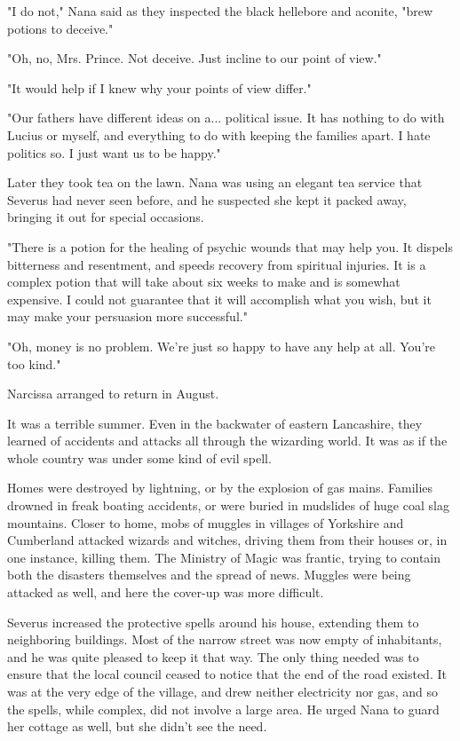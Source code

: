 "I do not," Nana said as they inspected the black hellebore and aconite, "brew potions to deceive."

"Oh, no, Mrs. Prince. Not deceive. Just incline to our point of view."

"It would help if I knew why your points of view differ."

"Our fathers have different ideas on a... political issue. It has nothing to do with Lucius or myself, and everything to do with keeping the families apart. I hate politics so. I just want us to be happy."

Later they took tea on the lawn. Nana was using an elegant tea service that Severus had never seen before, and he suspected she kept it packed away, bringing it out for special occasions.

"There is a potion for the healing of psychic wounds that may help you. It dispels bitterness and resentment, and speeds recovery from spiritual injuries. It is a complex potion that will take about six weeks to make and is somewhat expensive. I could not guarantee that it will accomplish what you wish, but it may make your persuasion more successful."

"Oh, money is no problem. We're just so happy to have any help at all. You're too kind."

Narcissa arranged to return in August.

It was a terrible summer. Even in the backwater of eastern Lancashire, they learned of accidents and attacks all through the wizarding world. It was as if the whole country was under some kind of evil spell.

Homes were destroyed by lightning, or by the explosion of gas mains. Families drowned in freak boating accidents, or were buried in mudslides of huge coal slag mountains. Closer to home, mobs of muggles in villages of Yorkshire and Cumberland attacked wizards and witches, driving them from their houses or, in one instance, killing them. The Ministry of Magic was frantic, trying to contain both the disasters themselves and the spread of news. Muggles were being attacked as well, and here the cover-up was more difficult.

Severus increased the protective spells around his house, extending them to neighboring buildings. Most of the narrow street was now empty of inhabitants, and he was quite pleased to keep it that way. The only thing needed was to ensure that the local council ceased to notice that the end of the road existed. It was at the very edge of the village, and drew neither electricity nor gas, and so the spells, while complex, did not involve a large area. He urged Nana to guard her cottage as well, but she didn't see the need.

